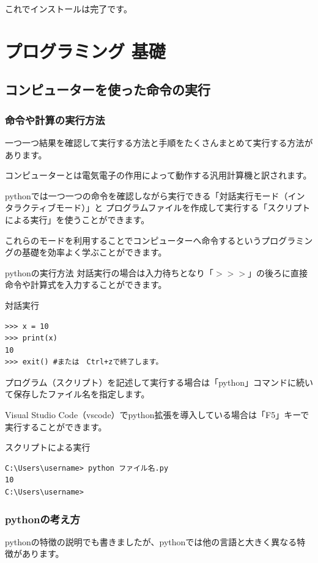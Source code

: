 \documentclass[11pt,a4paper,dvipdfmx,titlepage]{jsreport}
\begin{document}
これでインストールは完了です。




\chapter{プログラミング 基礎}
\setcounter{section}{0}

\section{コンピューターを使った命令の実行}
\subsection{命令や計算の実行方法}
 一つ一つ結果を確認して実行する方法と手順をたくさんまとめて実行する方法があります。

 コンピューターとは電気電子の作用によって動作する汎用計算機と訳されます。
 
 pythonでは一つ一つの命令を確認しながら実行できる「対話実行モード（インタラクティブモード）」と
 プログラムファイルを作成して実行する「スクリプトによる実行」を使うことができます。
 
 これらのモードを利用することでコンピューターへ命令するというプログラミングの基礎を効率よく学ぶことができます。

\begin{pabox}{pythonの実行方法}
対話実行の場合は入力待ちとなり「$>>>$」の後ろに直接命令や計算式を入力することができます。
\begin{grabox}{対話実行}
\begin{verbatim}
>>> x = 10
>>> print(x)
10
>>> exit() #または　Ctrl+zで終了します。
\end{verbatim}
\end{grabox}
\newpage
プログラム（スクリプト）を記述して実行する場合は「python」コマンドに続いて保存したファイル名を指定します。

Visual Studio Code（vscode）でpython拡張を導入している場合は「F5」キーで実行することができます。
\begin{grabox}{スクリプトによる実行}
\begin{verbatim}
C:\Users\username> python ファイル名.py
10
C:\Users\username> 
\end{verbatim}
\end{grabox}

\end{pabox}
 
 
 
\subsection{pythonの考え方}
pythonの特徴の説明でも書きましたが、pythonでは他の言語と大きく異なる特徴があります。
\end{document}
